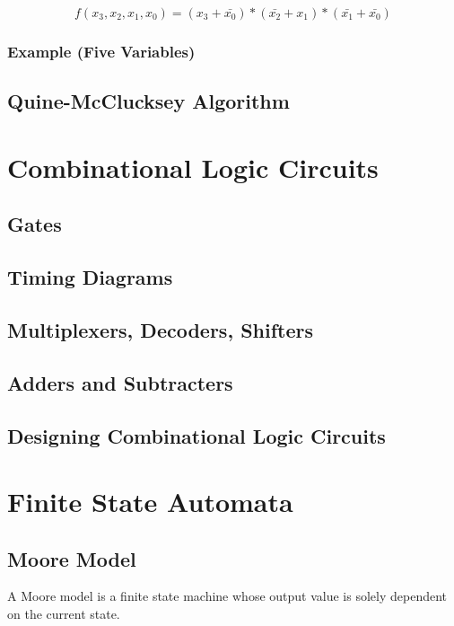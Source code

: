 \documentclass[11pt]{article}
\begin{document}
\vspace{-1cm}

\[ f(x_3,x_2,x_1,x_0) = (x_3 + \bar{x_0}) * (\bar{x_2} + x_1) * (\bar{x_1} + \bar{x_0}) \]

\subsubsection{Example (Five Variables)}

\subsection{Quine-McClucksey Algorithm}

\section{Combinational Logic Circuits}

\subsection{Gates}

\subsection{Timing Diagrams}

\subsection{Multiplexers, Decoders, Shifters}

\subsection{Adders and Subtracters}

\subsection{Designing Combinational Logic Circuits}

\section{Finite State Automata}

\subsection{Moore Model}

A Moore model is a finite state machine whose output value is solely dependent on the current state.
\end{document}
